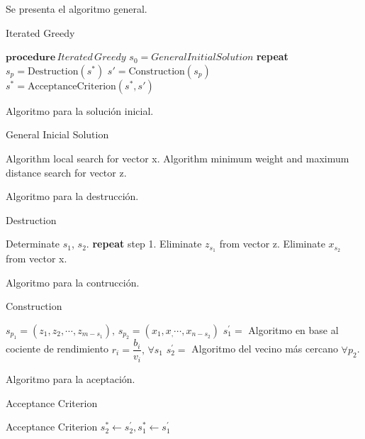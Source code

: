 \documentclass{report}
\begin{document}
Se presenta el algoritmo general.
\begin{algorithm}
   \caption{Iterated Greedy}
    \begin{algorithmic}[1]
        \State $\textbf{procedure} \, Iterated \, Greedy$
        \State \hspace{1cm} $s_0 = General InitialSolution$
        \State \hspace{1cm} \textbf{repeat}
        \State \hspace{1.5 cm} $s_p = \text{Destruction}(s^*)$
        \State \hspace{1.5 cm} $s' = \text{Construction}(s_p)$
        \State \hspace{1.5 cm} $s^* = \text{AcceptanceCriterion}(s^*,s')$
    \end{algorithmic}
\end{algorithm}

Algoritmo para la solución inicial.
\begin{algorithm}
    \caption{General Inicial Solution}
    \begin{algorithmic}[1]
        \State Algorithm local search for vector x.
        \State Algorithm minimum weight and maximum distance search for vector z. 
    \end{algorithmic}
\end{algorithm}

Algoritmo para la destrucción.
\begin{algorithm}
    \caption{Destruction}
    \begin{algorithmic}[1]
        \State Determinate $s_1$, $s_2$. 
            \State \textbf{repeat} step 1.
        \EndIf
        \State Eliminate $z_{s_1}$ from vector z.
        \State Eliminate $x_{s_2}$ from vector x.

    \end{algorithmic}
\end{algorithm}

Algoritmo para la contrucción.
\begin{algorithm}[h!]
    \caption{Construction}
    \begin{algorithmic}[1]
        \State  $s_{p_1} = (z_1,z_2, \cdots ,z_{m-s_1}), \, s_{p_2} = (x_1,x_, \cdots ,x_{n-s_2})$
        \State  $s^{'}_1=$ Algoritmo en base al cociente de rendimiento $r_i = \dfrac{b_i}{v_i}, \, \forall s_1$
        \State  $s^{'}_2 =$ Algoritmo del vecino más cercano $\forall p_2 $.
         
    \end{algorithmic}
\end{algorithm}    

Algoritmo para la aceptación.
\begin{algorithm}[h!]
    \caption{Acceptance Criterion}
    \begin{algorithmic}[1]
        \State Acceptance Criterion 
        \State $ s_{2}^{*}\longleftarrow s^{'}_{2} ,s_{1}^{*} \longleftarrow s^{'}_{1}$
        \EndIf
    \end{algorithmic}
\end{algorithm}
\end{document}
